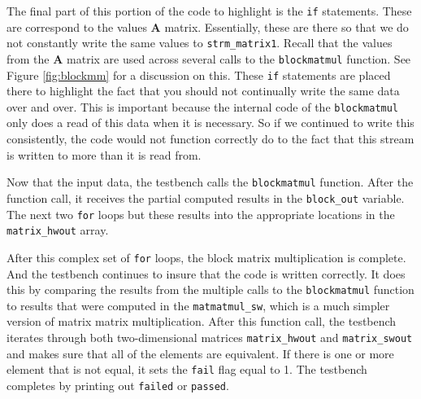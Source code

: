 The final part of this portion of the code to highlight is the \lstinline{if} statements. These are correspond to the values $\mathbf{A}$ matrix. Essentially, these are there so that we do not constantly write the same values to \lstinline{strm_matrix1}. Recall that the values from the $\mathbf{A}$ matrix are used across several calls to the \lstinline{blockmatmul} function. See Figure \ref{fig:blockmm} for a discussion on this. These \lstinline{if} statements are placed there to highlight the fact that you should not continually write the same data over and over. This is important because the internal code of the \lstinline{blockmatmul} only does a read of this data when it is necessary. So if we continued to write this consistently, the code would not function correctly do to the fact that this stream is written to more than it is read from.

Now that the input data, the testbench calls the \lstinline{blockmatmul} function. After the function call, it receives the partial computed results in the \lstinline{block_out} variable. The next two \lstinline{for} loops but these results into the appropriate locations in the \lstinline{matrix_hwout} array. 

After this complex set of \lstinline{for} loops, the block matrix multiplication is complete. And the testbench continues to insure that the code is written correctly. It does this by comparing the results from the multiple calls to the \lstinline{blockmatmul} function to results that were computed in the \lstinline{matmatmul_sw}, which is a much simpler version of matrix matrix multiplication. After this function call, the testbench iterates through both two-dimensional matrices \lstinline{matrix_hwout} and \lstinline{matrix_swout} and makes sure that all of the elements are equivalent. If there is one or more element that is not equal, it sets the \lstinline{fail} flag equal to 1. The testbench completes by printing out \lstinline{failed} or \lstinline{passed}.

